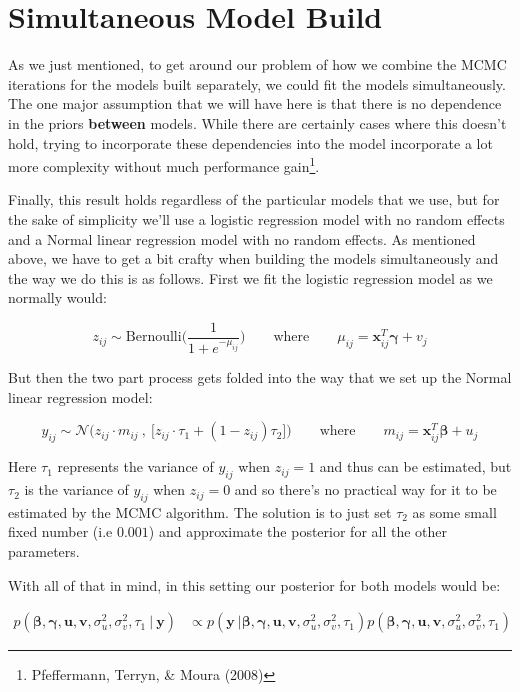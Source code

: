 \documentclass[12pt,twoside]{reedthesis}
\begin{document}
\hypertarget{simultaneous-model-build}{%
\section{Simultaneous Model Build}\label{simultaneous-model-build}}

As we just mentioned, to get around our problem of how we combine the MCMC iterations for the models built separately, we could fit the models simultaneously. The one major assumption that we will have here is that there is no dependence in the priors \textbf{between} models. While there are certainly cases where this doesn't hold, trying to incorporate these dependencies into the model incorporate a lot more complexity without much performance gain\footnote{Pfeffermann, Terryn, \& Moura (2008)}.

Finally, this result holds regardless of the particular models that we use, but for the sake of simplicity we'll use a logistic regression model with no random effects and a Normal linear regression model with no random effects. As mentioned above, we have to get a bit crafty when building the models simultaneously and the way we do this is as follows. First we fit the logistic regression model as we normally would:

\[
z_{ij} \sim \text{Bernoulli}\Bigg(\frac{1}{1 + e^{-\mu_{ij}}}\Bigg) \qquad \text{where} \qquad \mu_{ij} =\mathbf{x}_{ij}^T\boldsymbol{\gamma} + v_j
\]

But then the two part process gets folded into the way that we set up the Normal linear regression model:

\[
y_{ij} \sim \mathcal{N}\bigg(z_{ij}\cdot m_{ij} \ , \ \Big[z_{ij}\cdot\tau_1 + (1 - z_{ij})\tau_2\Big]\bigg) \qquad \text{where} \qquad m_{ij} =\mathbf{x}_{ij}^T\boldsymbol{\beta} + u_j
\]

Here \(\tau_1\) represents the variance of \(y_{ij}\) when \(z_{ij} = 1\) and thus can be estimated, but \(\tau_2\) is the variance of \(y_{ij}\) when \(z_{ij} = 0\) and so there's no practical way for it to be estimated by the MCMC algorithm. The solution is to just set \(\tau_2\) as some small fixed number (i.e \(0.001\)) and approximate the posterior for all the other parameters.

With all of that in mind, in this setting our posterior for both models would be:

\[
\begin{aligned}
p(\boldsymbol{\beta}, \boldsymbol{\gamma}, \mathbf{u}, \mathbf{v}, \sigma_u^2, \sigma_v^2, \tau_1\ | \ \mathbf{y}) &\propto p(\mathbf{y} \ | \boldsymbol{\beta}, \boldsymbol{\gamma}, \mathbf{u}, \mathbf{v}, \sigma_u^2, \sigma_v^2, \tau_1)p(\boldsymbol{\beta}, \boldsymbol{\gamma}, \mathbf{u}, \mathbf{v}, \sigma_u^2, \sigma_v^2, \tau_1) 
\end{aligned}
\]
\end{document}
